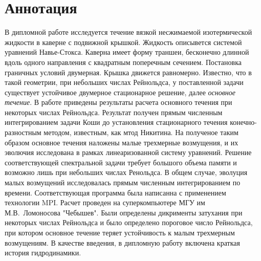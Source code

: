 \documentclass{scrartcl}
\begin{document}
\section{Аннотация}
  В дипломной работе исследуется течение вязкой несжимаемой изотермической жидкости в каверне с подвижной крышкой. 
  Жидкость описывется системой уравнений Навье-Стокса. Каверна имеет форму траншеи, бесконечно длинной 
  вдоль одного направления с квадратным поперечным сечением. Постановка граничных условий двумерная. 
  Крышка движется равномерно. Известно, что в такой геометрии, при небольших числах Рейнольдса, у поставленной задачи
  существует устойчивое двумерное стационарное решение, далее \textit{основное течение}. В работе приведены результаты
  расчета основного течения при некоторых числах Рейнольдса. Результат получен прямым численным интегрированием задачи 
  Коши до установления стационарного течения конечно-разностным методом, известным, как мтод Никитина. 
  На полученое таким образом основное течения наложены малые 
  трехмерные возмущения, и их эволючия исследована в рамках линеаризованной систему уравнений. Решение 
  соответствующей спектральной задачи требует большого объема памяти и возможно лишь при небольших числах Ренольдса.
  В общем случае, эволуция малых возмущений исследовалась прямым численным интегрированием по времени. 
  Соответствующая программа была написанна с применением технологии MPI. Расчет проведен на суперкомпьютере 
  МГУ им М.В.~Ломоносова "Чебышев". Были определены дикрименты затухания при некоторых числах Рейнольдса и было 
  определено пороговое число Рейнольдса, при котором основное течение теряет устойчивость к малым трехмерным возмущениям. 
  В качестве введения, в дипломную работу включена краткая история гидродинамики.

\newpage  
  
  
%  
%  
  
  
%  
  
%  
  
\end{document}
